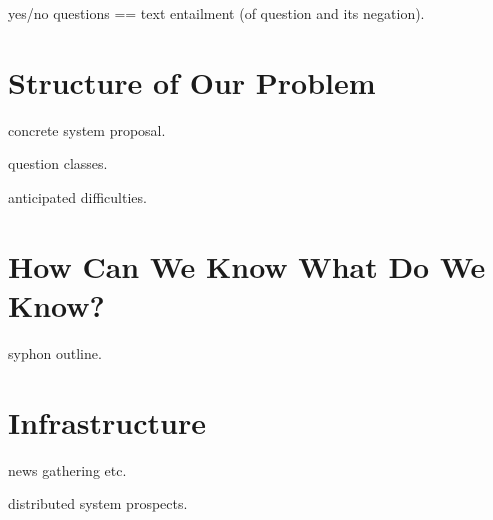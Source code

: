 \documentclass[11pt,a4paper]{article}
\begin{document}
yes/no questions == text entailment (of question and its negation).

\section{Structure of Our Problem}

concrete system proposal.

question classes.

anticipated difficulties.

\section{How Can We Know What Do We Know?}

syphon outline.

\section{Infrastructure}

news gathering etc.

distributed system prospects.



\end{document}
